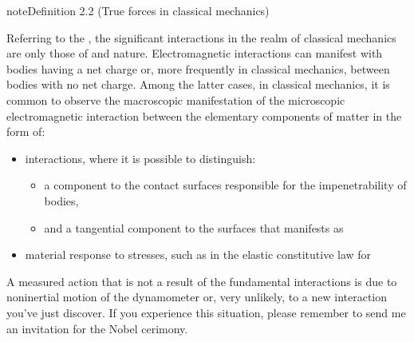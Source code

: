 \documentclass[letterpaper,10pt,english]{jupyterBook}
\begin{document}
\label{ch/actions:def:true-forces}
\begin{sphinxadmonition}{note}{Definition 2.2 (True forces in classical mechanics)}



\sphinxAtStartPar
Referring to the , the significant interactions in the realm of classical mechanics are only those of {\hyperref[\detokenize{ch/actions-examples:classical-mechanics-actions-gravitation}]{}} and  nature. Electromagnetic interactions can manifest with bodies having a net charge or, more frequently in classical mechanics, between bodies with no net charge. Among the latter cases, in classical mechanics, it is common to observe the macroscopic manifestation of the microscopic electromagnetic interaction between the elementary components of matter in the form of:
\begin{itemize}
\item {} 
\sphinxAtStartPar
{\hyperref[\detokenize{ch/actions-reactions:classical-mechanics-actions-reactions-contact}]{}} interactions, where it is possible to distinguish:
\begin{itemize}
\item {} 
\sphinxAtStartPar
a  component to the contact surfaces responsible for the impenetrability of bodies,

\item {} 
\sphinxAtStartPar
and a tangential component to the surfaces that manifests as {\hyperref[\detokenize{ch/actions-reactions:classical-mechanics-actions-reactions-contact-friction}]{}}

\end{itemize}

\item {} 
\sphinxAtStartPar
material response to stresses, such as in the elastic constitutive law for {\hyperref[\detokenize{ch/actions-examples:classical-mechanics-actions-spring}]{}}

\end{itemize}
\end{sphinxadmonition}

\sphinxAtStartPar
A measured action that is not a result of the fundamental interactions is due to non\sphinxhyphen{}inertial motion of the dynamometer \sphinxhyphen{} or, very unlikely, to a new interaction you’ve just discover. If you experience this situation, please remember to send me an invitation for the Nobel cerimony.
\end{document}
